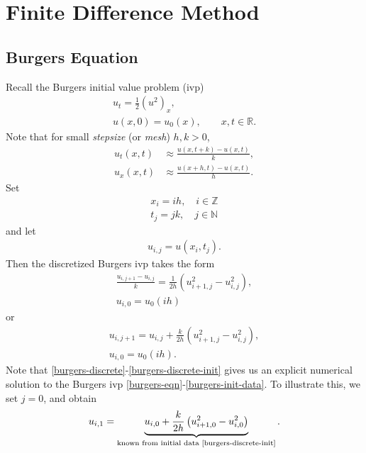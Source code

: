 \documentclass[12pt,reqno]{amsart}
\numberwithin{equation}{section}  %
\numberwithin{figure}{section}
\newcommand{\rr}{\mathbb{R}}
\theoremstyle{plain}
\theoremstyle{definition}
\theoremstyle{remark}
\begin{document}
\section{Finite Difference Method}
\subsection{Burgers Equation}
Recall the Burgers initial value problem (ivp)
%
%
\begin{gather}
	\label{burgers-eqn}
	u_{t} = \frac{1}{2}(u^{2})_{x},
	\\
	\label{burgers-init-data}
	u(x, 0) = u_{0}(x), \qquad x, t \in \rr.
\end{gather}
%
%
Note that for small \emph{stepsize} (or \emph{mesh}) $h, k >0$, 
%
%
\begin{equation*}
	\begin{split}
		 u_{t}(x,t) &\approx \frac{u(x, t+k) - u(x, t)}{k},
		\\
		 u_{x}(x, t) & \approx \frac{u(x+h, t) - u(x, t)}{h}.
	\end{split}
\end{equation*}
%
%
Set
\begin{gather*}
	x_i = ih, \quad i \in \mathbb{Z}
	\\
	t_{j}=jk, \quad j \in \mathbb{N}
\end{gather*}
and let
\begin{gather*}
	u_{i,j} = u(x_{i}, t_{j}).
\end{gather*}
%
%
Then the discretized Burgers ivp takes the form
%
%
\begin{gather*}
	\frac{u_{i, j+1}- u_{i,j}}{k}=\frac{1}{2h}\left( u_{i+1,j}^{2} -
	u_{i,j}^{2} \right),
	\\
	u_{i,0} = u_{0}(ih)
\end{gather*}
%
%
or
\begin{gather}
	\label{burgers-discrete}
	u_{i, j+1}=u_{i,j} + \frac{k}{2h}\left( u_{i+1,j}^{2} -
	u_{i,j}^{2} \right),
	\\
	\label{burgers-discrete-init}
	u_{i,0} = u_{0}(ih).
\end{gather}
Note that \eqref{burgers-discrete}-\eqref{burgers-discrete-init} gives us an
explicit numerical solution to the Burgers ivp
\eqref{burgers-eqn}-\eqref{burgers-init-data}. To illustrate this, we set
$j=0$, and obtain
%
%
\begin{equation}
	\label{case-j=0}
	\begin{split}
		u_{i,1} = \underbrace{u_{i,0} + \frac{k}{2h}\left( u_{i+1,0}^{2} -
		u_{i,0}^{2} \right)}_{\text{known from initial data
		\eqref{burgers-discrete-init}}}.
	\end{split}
\end{equation}
\end{document}
